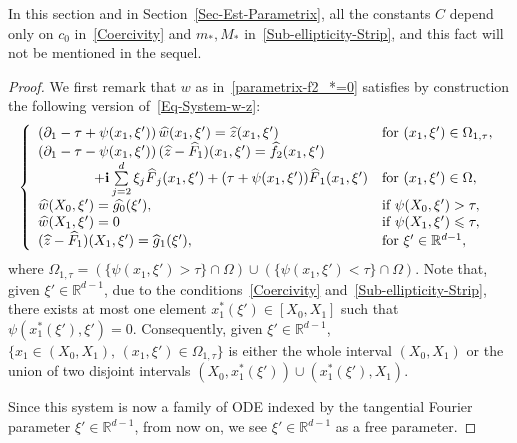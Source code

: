 \documentclass[AHL,Unicode,longabstracts]{cedram}
\newcommand*\R{\mathbb{R}}
\renewcommand{\i}{\mathbf{i}}
\renewcommand{\leq}{\leqslant}
\renewcommand{\hat}{\widehat}
\let\oldhat\hat
\renewcommand*{\hat}[1]{\mathchoice{\widehat{#1}}{\widehat{#1}}{\oldhat{#1}}{\oldhat{#1}}}
\begin{document}
In this section and in Section~\ref{Sec-Est-Parametrix}, all the constants $C$ depend only on $c_0$ in~\eqref{Coercivity} and $m_*, M_*$ in~\eqref{Sub-ellipticity-Strip}, and this fact will not be mentioned in the sequel.

\begin{proof}
We first remark that $w$ as in~\eqref{parametrix-f2_*=0} satisfies by construction the following version of~\eqref{Eq-System-w-z}:
\begin{equation}\label{Eq-System-w-z-bis}
\left\{
\begin{array}{ll}
\left(\partial_1-\tau+\psi(x_1,\xi') \right) \widehat{w}(x_1,\xi')=\widehat{z}(x_1,\xi') &\text{for } (x_1, \xi') \in \Omega_{1,\tau},
\\
\left(\partial_1-\tau-\psi(x_1,\xi') \right)(\widehat{z} - \widehat F_1)(x_1,\xi')=\widehat f_2(x_1, \xi')
\\
\qquad\qquad + \i \sum\limits_{j=2}^d \xi_j \hat F_j(x_1, \xi') + (\tau + \psi(x_1, \xi')) \hat F_1(x_1, \xi') &\text{for } (x_1, \xi') \in \Omega,
\\
\widehat{w}(X_0,\xi')= \widehat{g_0}(\xi'), &\text{if } \psi(X_0, \xi') > \tau,
\\
\widehat{w}(X_1,\xi')= 0 &\text{if } \psi(X_1, \xi') \leq \tau,
\\
(\widehat z -\widehat F_1)(X_1, \xi') = \hat g_1 (\xi'), &\text{for } \xi' \in \R^{d-1},
\end{array}
\right.
\end{equation}
where $\Omega_{1,\tau} = (\{ \psi(x_1, \xi') > \tau\} \cap \Omega) \cup (\{ \psi(x_1, \xi') < \tau\} \cap \Omega)$. Note that, given $\xi' \in \R^{d-1}$, due to the conditions~\eqref{Coercivity} and~\eqref{Sub-ellipticity-Strip}, there exists at most one element $x_1^*(\xi') \in [X_0, X_1]$ such that $\psi(x_1^*(\xi'), \xi') = 0$. Consequently, given $\xi' \in \R^{d-1}$, $\{ x_1 \in (X_0, X_1), \, (x_1, \xi') \in \Omega_{1, \tau} \}$ is either the whole interval $(X_0, X_1)$ or the union of two disjoint intervals $(X_0, x_1^*(\xi')) \cup (x_1^*(\xi'), X_1)$.


Since this system is now a family of ODE indexed by the tangential Fourier parameter $\xi' \in \R^{d-1}$, from now on, we see $\xi' \in \R^{d-1}$ as a free parameter.


\end{proof}
\end{document}
